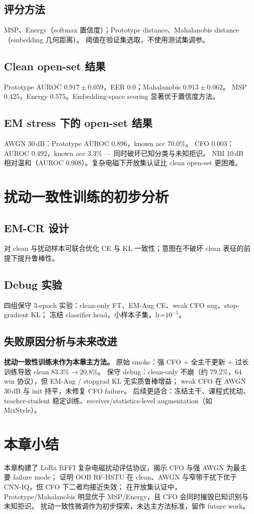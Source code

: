\subsection{评分方法}
MSP、Energy（softmax 置信度）；Prototype distance、Mahalanobis distance（embedding 几何距离）。
阈值在验证集选取，不使用测试集调参。

\subsection{Clean open-set 结果}
Prototype AUROC $0.917 \pm 0.059$，EER $0.0$；Mahalanobis $0.913 \pm 0.062$。
MSP $0.425$，Energy $0.575$。Embedding-space scoring 显著优于置信度方法。

\subsection{EM stress 下的 open-set 结果}
AWGN 30\,dB：Prototype AUROC 0.896，known acc 70.0\%。
CFO 0.003：AUROC 0.492，known acc 3.3\% — 同时破坏已知分类与未知拒识。
NBI 10\,dB 相对温和（AUROC 0.908）。复杂电磁下开放集认证比 clean open-set 更困难。

\section{扰动一致性训练的初步分析}
\label{sec:ch5_emcr}

\subsection{EM-CR 设计}
对 clean 与扰动样本可联合优化 CE 与 KL 一致性；意图在不破坏 clean 表征的前提下提升鲁棒性。

\subsection{Debug 实验}
四组保守 3-epoch 实验：clean-only FT、EM-Aug CE、weak CFO aug、stop-gradient KL；
冻结 classifier head，小样本子集，lr=$10^{-5}$。

\subsection{失败原因分析与未来改进}
\textbf{扰动一致性训练未作为本章主方法。}
原始 smoke：强 CFO + 全主干更新 + 过长训练导致 clean 83.3\%$\to$20.8\%。
保守 debug：clean-only 不崩（约 79.2\%，64 win 协议），但 EM-Aug / stopgrad KL 无实质鲁棒增益；
weak CFO 在 AWGN 30\,dB 与 init 持平，未修复 CFO failure。
后续更适合：冻结主干、课程式扰动、teacher-student 稳定训练、receiver/statistics-level augmentation（如 MixStyle）。

\section{本章小结}
\label{sec:ch5_summary}

本章构建了 LoRa RFFI 复杂电磁扰动评估协议，揭示 CFO 与强 AWGN 为最主要 failure mode；
证明 OOB RF-HSTU 在 clean、AWGN 与窄带干扰下优于 CNN-IQ，但 CFO 下二者均接近失效；
在开放集认证中，Prototype/Mahalanobis 明显优于 MSP/Energy，且 CFO 会同时摧毁已知识别与未知拒识。
扰动一致性微调作为初步探索，未达主方法标准，留作 future work。

